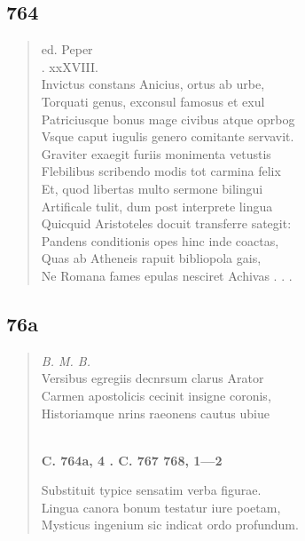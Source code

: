 \documentclass[11pt, a4paper]{report}
\begin{document}
            \subsection*{764}
      \begin{verse}
      ed. Peper \\ . xxXVIII. \\ Invictus constans Anicius, ortus ab urbe, \\ Torquati genus, exconsul famosus et exul \\ Patriciusque bonus mage civibus atque oprbog \\ Vsque caput iugulis genero comitante servavit. \\ Graviter exaegit furiis monimenta vetustis \\ Flebilibus scribendo modis tot carmina felix \\ Et, quod libertas multo sermone bilingui \\ Artificale tulit, dum post interprete lingua \\ Quicquid Aristoteles docuit transferre sategit: \\ Pandens conditionis opes hinc inde coactas, \\ Quas ab Atheneis rapuit bibliopola gais, \\ Ne Romana fames epulas nesciret Achivas . . . \\ 
      \end{verse}
  
            \subsection*{76a}
      \begin{verse}
      \textit{B. M. B.} \\ Versibus egregiis decnrsum clarus Arator \\ Carmen apostolicis cecinit insigne coronis, \\ Historiamque nrins raeonens cautus ubiue \\ 
        ﻿\pagebreak 
    \begin{center} \textbf{C. 764a, 4 . C. 767 768, 1—2} \end{center} \marginpar{[252]} Substituit typice sensatim verba figurae. \\ Lingua canora bonum testatur iure poetam, \\ Mysticus ingenium sic indicat ordo profundum. \\ 
      \end{verse}
  
\end{document}
